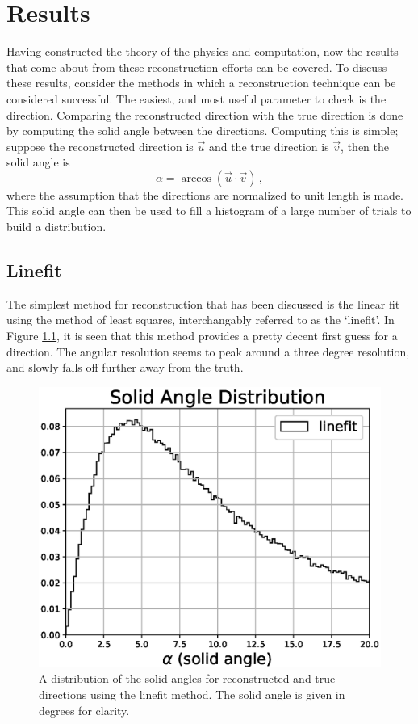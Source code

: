 \chapter{Results}

Having constructed the theory of the physics and computation, now the results that come about from these reconstruction efforts can be covered. To discuss these results, consider the methods in which a reconstruction technique can be considered successful. The easiest, and most useful parameter to check is the direction. Comparing the reconstructed direction with the true direction is done by computing the solid angle between the directions. Computing this is simple; suppose the reconstructed direction is $\vec{u}$ and the true direction is $\vec{v}$, then the solid angle is
\begin{equation}
  \alpha = \arccos(\vec{u}\cdot\vec{v})\, ,
\end{equation}
where the assumption that the directions are normalized to unit length is made. This solid angle can then be used to fill a histogram of a large number of trials to build a distribution. 

\section{Linefit}

The simplest method for reconstruction that has been discussed is the linear fit using the method of least squares, interchangably referred to as the `linefit'. In Figure \ref{fig:alpha_linefit}, it is seen that this method provides a pretty decent first guess for a direction. The angular resolution seems to peak around a three degree resolution, and slowly falls off further away from the truth. 

\begin{figure}[H]
  \centering
  \includegraphics[width=12cm]{./Figures/reco_plots/alpha_dist_linefit_norm.eps}
  \caption{A distribution of the solid angles for reconstructed and true directions using the linefit method. The solid angle is given in degrees for clarity.}
  \label{fig:alpha_linefit}
\end{figure}

